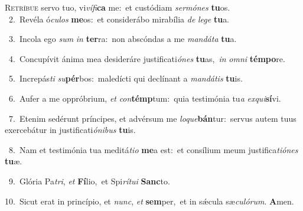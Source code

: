\lettrine{\initial\textcolor{\initialcolor}{R}}{etríbue} servo tuo, vi\-\textit{ví}\-\textit{fi}\textbf{ca} me:~\star et custódiam \textit{ser}\-\textit{mó}\textit{nes} \textbf{tu}\-os.\\
{\numbfont\textcolor{\numbcolor}{~2.}}~Revéla ó\-\textit{cu}\-\textit{los} \textbf{me}\-os:~\star et considerábo mirabília \textit{de} \textit{le}\-\textit{ge} \textbf{tu}\-a.\par
{\numbfont\textcolor{\numbcolor}{~3.}}~Incola ego \textit{sum} \textit{in} \textbf{ter}\-ra:~\star non abscóndas a me \textit{man}\-\textit{dá}\textit{ta} \textbf{tu}\-a.\par
{\numbfont\textcolor{\numbcolor}{~4.}}~Concupívit ánima mea desideráre justificati\-\textit{ó}\-\textit{nes} \textbf{tu}\-as,~\star \textit{in} \textit{om}\-\textit{ni} \textbf{tém}\-\textbf{po}re.\par
{\numbfont\textcolor{\numbcolor}{~5.}}~Increpás\textit{ti} \textit{su}\-\textbf{pér}bos:~\star maledícti qui declínant a \textit{man}\-\textit{dá}\textit{tis} \textbf{tu}\-is.\par
{\numbfont\textcolor{\numbcolor}{~6.}}~Aufer a me oppróbrium, \textit{et} \textit{con}\-\textbf{témp}tum:~\star quia testimónia tu\textit{a} \textit{ex}\-\textit{qui}\textbf{sí}vi.\par
{\numbfont\textcolor{\numbcolor}{~7.}}~Etenim sedérunt príncipes, et advérsum me \textit{lo}\-\textit{que}\textbf{bán}tur:~\star servus autem tuus exercebátur in justificati\-\textit{ó}\-\textit{ni}\textit{bus} \textbf{tu}\-is.\par
{\numbfont\textcolor{\numbcolor}{~8.}}~Nam et testimónia tua meditá\-\textit{ti}\-\textit{o} \textbf{me}\-a est:~\star et consílium meum justifica\-\textit{ti}\-\textit{ó}\textit{nes} \textbf{tu}\-æ.\par
{\numbfont\textcolor{\numbcolor}{~9.}}~Glória Pa\-\textit{tri}\-, \textit{et} \textbf{Fí}\-lio,~\star et Spi\-\textit{rí}\-\textit{tu}\textit{i} \textbf{Sanc}\-to.\par
{\numbfont\textcolor{\numbcolor}{10.}}~Sicut erat in princípio, et \textit{nunc}\-, \textit{et} \textbf{sem}\-per,~\star et in sǽcula sæ\-\textit{cu}\-\textit{ló}\textit{rum}. \textbf{A}\-men.\par
